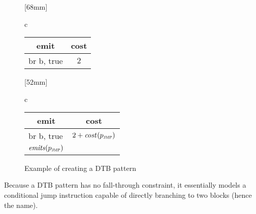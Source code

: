 \begin{figure}
                [68mm]%
                {%
                  \begin{tabular}{c}
                    \\[.5\betweensubfigures]
                    \figureFont\figureFontSize%
                    \begin{tabular}{lc}
                      \toprule
                        \multicolumn{1}{c}{\tabhead emit} & \tabhead cost\\
                      \midrule
                        {\instrFont br b, true} & $2$\\
                      \bottomrule
                    \end{tabular}%
                  \end{tabular}%
                }%
  \hfill%
                [52mm]%
                {%
                  \begin{tabular}{c}
                    \newcommand{\fallthruString}{}%
                    \\[.5\betweensubfigures]
                    \figureFont\figureFontSize%
                    \begin{tabular}{lc}
                      \toprule
                        \multicolumn{1}{c}{\tabhead emit} & \tabhead cost\\
                      \midrule
                        {\instrFont br b, true}
                      & $2 + \operatorname{\textrm{\textit{cost}}}\hspace{.4pt}(p_{\textsc{jmp}})$\\
                        $\operatorname{\textrm{\textit{emits}}}(p_{\textsc{jmp}})$
                      & \\
                      \bottomrule
                    \end{tabular}%
                  \end{tabular}%
                }

  \caption{Example of creating a DTB pattern}%
\end{figure}
%
Because a \gls{DTB pattern} has no \gls{fall-through} \gls{constraint}, it
essentially models a conditional jump \gls{instruction} capable of directly
branching to two \glspl{block} (hence the name).

